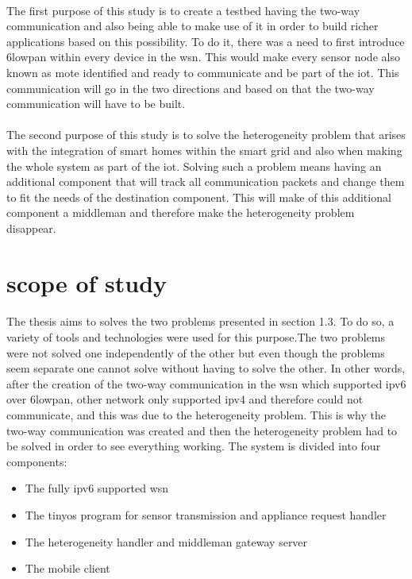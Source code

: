 \documentclass[oneside,12pt,a4paper,final]{book}
\begin{document}
\paragraph{}
The first purpose of this study is to create a testbed having the two-way communication and also being able to make use of it in order to build richer applications based on this possibility. To do it, there was a need to first introduce \gls{6lowpan} within every device in the \gls{wsn}. This would make every sensor node also known as mote identified and ready to communicate and be part of the \gls{iot}. This communication will go in the two directions and based on that the two-way communication will have to be built.
\paragraph{}
The second purpose of this study is to solve the heterogeneity problem that arises with the integration of smart homes within the smart grid and also when making the whole system as part of the \gls{iot}. Solving such a problem means having an additional component that will track all communication packets and change them to fit the needs of the destination component. This will make of this additional component a middleman and therefore make the heterogeneity problem disappear.

\section{scope of study}
\paragraph{}
The thesis aims to solves the two problems presented in section 1.3. To do so, a variety of tools and technologies were used for this purpose.The two problems were not solved one independently of the other but even though the problems seem separate one cannot solve without having to solve the other. In other words, after the creation of the two-way communication in the \gls{wsn} which supported \gls{ipv6} over \gls{6lowpan}, other network only supported \gls{ipv4} and therefore could not communicate, and this was due to the heterogeneity problem. This is why the two-way communication was created and then the heterogeneity problem had to be solved in order to see everything working.
The system is divided into four components:
\begin{itemize}
\item The fully \gls{ipv6} supported \gls{wsn}
\item The \gls{tinyos} program for sensor transmission and appliance request handler
\item The heterogeneity handler and middleman gateway server
\item The mobile client
\end{itemize}
\end{document}
